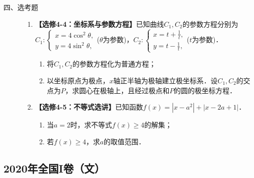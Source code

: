 \begin{description}
    \item[四、选考题]
    \begin{enumerate}[leftmargin=5pt]
        \addtocounter{enumi}{+21}
        \item \textbf{【选修4-4：坐标系与参数方程】}已知曲线$C_1,C_2$的参数方程分别为$C_1:\begin{cases}x=4\cos^2\theta,\\y=4\sin^2\theta,\end{cases}$($\theta$为参数)，$C_2:\begin{cases}x=t+\frac{1}{t},\\y=t-\frac{1}{t},\end{cases}$($t$为参数)．
        \begin{enumerate}[label=(\arabic*)]
            \item 将$C_1,C_2$的参数方程化为普通方程；
            \item 以坐标原点为极点，$x$轴正半轴为极轴建立极坐标系．设$C_1,C_2$的交点为$P$，求圆心在极轴上，且经过极点和$P$的圆的极坐标方程．
        \end{enumerate}

        \item \textbf{【选修4-5：不等式选讲】}已知函数$f(x)=|x-a^2|+|x-2a+1|$．
        \begin{enumerate}[label=(\arabic*)]
            \item 当$a=2$时，求不等式$f(x)\geqslant 4$的解集；
            \item 若$f(x)\geqslant 4$，求$a$的取值范围．
        \end{enumerate}
    \end{enumerate}
\end{description}
\clearpage


\subsection{2020年全国I卷（文）}\label{gk:2020年全国I卷（文）}

